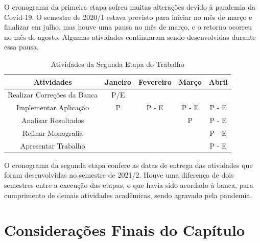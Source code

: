 O cronograma da primeira etapa sofreu muitas alterações devido à pandemia da Covid-19. O semestre de 2020/1 estava previsto para iniciar no mês de março e finalizar em julho, mas houve uma pausa no 
mês de março, e o retorno ocorreu no mês de agosto. Algumas atividades continuaram sendo desenvolvidas durante essa pausa.



\begin{table}[ht]
	\centering
	\caption{Atividades da Segunda Etapa do Trabalho}
	\label{tab05}
	
	\begin{tabular}{ccccc}
		\toprule
		\textbf{Atividades} & \textbf{Janeiro} & 
		\textbf{Fevereiro}  & \textbf{Março}& \textbf{Abril}\\
		\midrule
		\begin{minipage} [t] {0.2\textwidth} \centering Realizar Correções da Banca \end{minipage} & P/E &  &  &  \\
		\midrule
		\begin{minipage} [t] {0.2\textwidth} \centering Implementar Aplicação \end{minipage} & P & P - E & P - E & P - E  \\
		\midrule
		\begin{minipage} [t] {0.2\textwidth} \centering Analisar Resultados \end{minipage} &  &  &P &P - E  \\
		\midrule
		\begin{minipage} [t] {0.2\textwidth} \centering Refinar Monografia \end{minipage} &  &  &  & P - E \\
		\midrule
		\begin{minipage} [t] {0.2\textwidth} \centering Apresentar Trabalho \end{minipage} &  & & & P - E \\
		\bottomrule
	\end{tabular}
\end{table}

O cronograma da segunda etapa confere as datas de entrega das atividades 
que foram desenvolvidas no semestre de 2021/2. Houve uma diferença de dois semestres entre a execução das etapas, 
o que havia sido acordado à banca, para cumprimento de demais atividades acadêmicas, sendo agravado pela pandemia.

\section{Considerações Finais do Capítulo}

